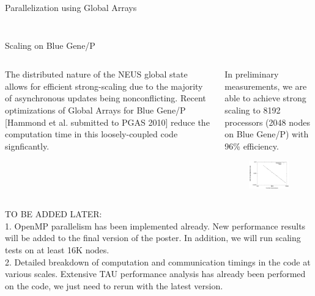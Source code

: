 \documentclass[final]{beamer}
\begin{document}
\begin{columns}[t]
\begin{column}{.25 \linewidth}
\begin{block}{Parallelization using Global Arrays}
\begin{columns}[t]
\begin{column}{.55\linewidth}
\begin{figure}[hctp]
                \end{figure}
	    \end{column}
	  \end{columns}
        \end{block}
        \begin{block}{Scaling on Blue Gene/P}

	  \begin{columns}[t]
	    \begin{column}{.32\linewidth}
	      The distributed nature of the NEUS global state allows for efficient strong-scaling due to the majority of asynchronous updates being nonconflicting.  Recent optimizations of Global Arrays for Blue Gene/P [Hammond et al. submitted to PGAS 2010] reduce the computation time in this loosely-coupled code signficantly.
	    \end{column}
	    \begin{column}{.65\linewidth}
                In preliminary measurements, we are able to achieve strong scaling to 8192 processors (2048 nodes on Blue Gene/P) with 96\% efficiency.
                \begin{figure}[hctp]
                    \includegraphics[width=1.0\linewidth]{images/scale.pdf}
                \end{figure}
	    \end{column}
	  \end{columns}
          {\color{red} TO BE ADDED LATER:} \\
          {\color{red} 1.} OpenMP parallelism has been implemented already.  New performance results will be added to the final version of the poster.  In addition, we will run scaling tests on at least 16K nodes. \\
          {\color{red} 2.} Detailed breakdown of computation and communication timings in the code at various scales.  Extensive TAU performance analysis has already been performed on the code, we just need to rerun with the latest version.
        \end{block}
      \end{column}


\end{columns}
\end{document}
